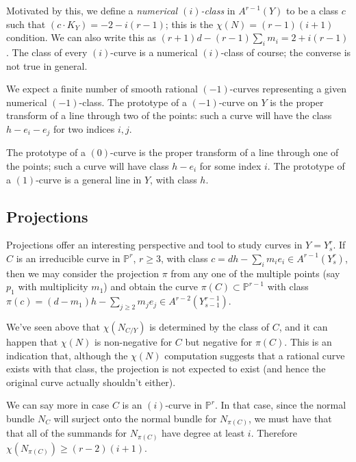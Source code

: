 \documentclass[12pt]{article}
\numberwithin{equation}{section}
\numberwithin{equation}{section}
\numberwithin{subeq}{equation}
\def\bbP{\mathbb{P}}
\begin{document}
Motivated by this, we define a \emph{numerical $(i)$-class} in $A^{r-1}(Y)$
to be a class $c$
such that $(c\cdot K_Y) = -2-i(r-1)$;
this is the $\chi(N)=(r-1)(i+1)$ condition.
We can also write this as
$(r+1)d - (r-1)\sum_i m_i = 2+i(r-1)$.
The class of every $(i)$-curve is a numerical $(i)$-class of course;
the converse is not true in general.

We expect a finite number of smooth rational $(-1)$-curves
representing a given numerical $(-1)$-class.
The prototype of a $(-1)$-curve on $Y$
is the proper transform of a line through two of the points:
such a curve will have the class $h - e_i - e_j$
for two indices $i,j$.

The prototype of a $(0)$-curve is the proper transform of a line through one of the points;
such a curve will have class $h-e_i$ for some index $i$.
The prototype of a $(1)$-curve is a general line in $Y$, with class $h$.



\subsection{Projections}\label{projections}
Projections offer an interesting perspective and tool
to study curves in $Y=Y^r_s$.
If $C$ is an irreducible curve in $\bbP^r$, $r \geq 3$,
with class $c = dh - \sum_i m_i e_i \in A^{r-1}(Y^r_s)$,
then we may consider the projection $\pi$ from any one of the multiple points
(say $p_1$ with multiplicity $m_1$)
and obtain the curve $\pi(C) \subset \bbP^{r-1}$
with class 
$\pi(c) = (d-m_1) h - \sum_{j \geq 2} m_j e_j \in A^{r-2}(Y^{r-1}_{s-1})$.

We've seen above that $\chi(N_{C/Y})$ is determined by the class of $C$,
and it can happen that $\chi(N)$ is non-negative for $C$ but negative for $\pi(C)$.
This is an indication that,
although the $\chi(N)$ computation suggests that a rational curve exists with that class,
the projection is not expected to exist
(and hence the original curve actually shouldn't either).

We can say more in case $C$ is an $(i)$-curve in $\bbP^r$.
In that case, since the normal bundle $N_C$ 
will surject onto the normal bundle for $N_{\pi(C)}$,
we must have that that all of the summands for $N_{\pi(C)}$ have degree at least $i$.
Therefore $\chi(N_{\pi(C)}) \geq (r-2)(i+1)$.
\end{document}
